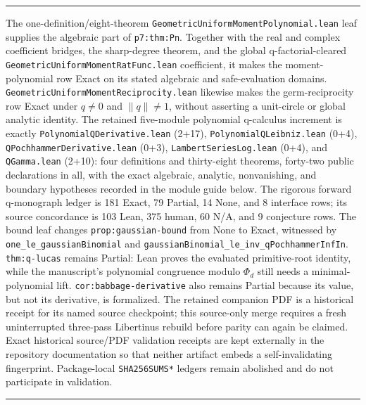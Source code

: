 \documentclass[11pt,oneside]{article}
\theoremstyle{definition}
\theoremstyle{remark}
\newenvironment{boxedremark}{%
  \par\smallskip\noindent\begin{center}\begin{minipage}{0.94\textwidth}%
  \color{black}\hrule\vspace{0.6em}\small
}{%
  \vspace{0.6em}\hrule\end{minipage}\end{center}\smallskip
}
\begin{document}
\begin{boxedremark}
The one-definition/eight-theorem
\nolinkurl{GeometricUniformMomentPolynomial.lean} leaf supplies the algebraic
part of \nolinkurl{p7:thm:Pn}.  Together with the real and complex coefficient
bridges, the sharp-degree theorem, and the global q-factorial-cleared
\nolinkurl{GeometricUniformMomentRatFunc.lean} coefficient, it makes the
moment-polynomial row Exact on its stated algebraic and safe-evaluation
domains.  \nolinkurl{GeometricUniformMomentReciprocity.lean} likewise makes
the germ-reciprocity row Exact under \(q\ne0\) and \(\lVert q\rVert\ne1\),
without asserting a unit-circle or global analytic identity.
The retained five-module polynomial q-calculus increment is exactly
\nolinkurl{PolynomialQDerivative.lean} (2+17),
\nolinkurl{PolynomialQLeibniz.lean} (0+4),
\nolinkurl{QPochhammerDerivative.lean} (0+3),
\nolinkurl{LambertSeriesLog.lean} (0+4), and
\nolinkurl{QGamma.lean} (2+10): four definitions and thirty-eight theorems,
forty-two public declarations in all, with the exact algebraic, analytic,
nonvanishing, and boundary hypotheses recorded in the module guide below.
The rigorous forward q-monograph ledger is 181 Exact, 79 Partial, 14 None,
and 8 interface rows; its source concordance is 103 Lean, 375 human, 60 N/A,
and 9 conjecture rows.  The bound leaf changes
\nolinkurl{prop:gaussian-bound} from None to Exact, witnessed by
\nolinkurl{one_le_gaussianBinomial} and
\nolinkurl{gaussianBinomial_le_inv_qPochhammerInfIn}.
\nolinkurl{thm:q-lucas} remains Partial: Lean proves the evaluated
primitive-root identity, while the manuscript's polynomial congruence modulo
\(\Phi_d\) still needs a minimal-polynomial lift.
\nolinkurl{cor:babbage-derivative} also remains Partial because its value,
but not its derivative, is formalized.  The retained companion PDF is a
historical receipt for its named source checkpoint; this source-only merge
requires a fresh uninterrupted three-pass Libertinus rebuild before parity can
again be claimed.  Exact historical source/PDF validation receipts are kept
externally in the repository documentation so that neither artifact embeds a
self-invalidating fingerprint.  Package-local \nolinkurl{SHA256SUMS*} ledgers
remain abolished and do not participate in validation.
\end{boxedremark}
\end{document}
